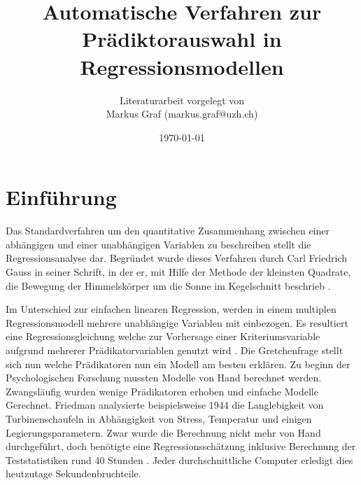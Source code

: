 \documentclass[english,12pt,doc]{apa}
\begin{document}
\title{Automatische Verfahren zur Prädiktorauswahl in Regressionsmodellen}
\author{Literaturarbeit vorgelegt von \\ Markus Graf (markus.graf@uzh.ch)}
\date{\today}
\maketitle
\setlength{\parindent}{0pt}
\newpage
\tableofcontents
\newpage
\section{Einführung}
Das Standardverfahren um den quantitative Zusammenhang zwischen einer abhängigen und einer unabhängigen Variablen zu beschreiben stellt die Regressionsanalyse dar. 
Begründet wurde dieses Verfahren durch Carl Friedrich Gauss in seiner Schrift, in der er, mit Hilfe der Methode der kleinsten Quadrate, die Bewegung der Himmelskörper um die Sonne im Kegelschnitt beschrieb \cite{gauss1809theoria}. 

Im Unterschied zur einfachen linearen Regression, werden in einem multiplen Regressionsmodell mehrere unabhängige Variablen mit einbezogen. 
Es resultiert eine Regressionsgleichung welche zur Vorhersage einer Kriteriumsvariable aufgrund mehrerer Prädikatorvariablen genutzt wird  \cite[S. 448]{bortz2011}. 
Die Gretchenfrage stellt sich nun welche Prädikatoren nun ein Modell am besten erklären. 
Zu beginn der Psychologischen Forschung mussten Modelle von Hand berechnet werden. Zwangsläufig wurden wenige Prädikatoren erhoben und einfache Modelle Gerechnet. 
Friedman analysierte beispielsweise 1944 die Langlebigkeit von Turbinenschaufeln in Abhängigkeit von Stress, Temperatur und einigen Legierungsparametern. 
Zwar wurde die Berechnung nicht mehr von Hand durchgeführt, doch benötigte eine Regressionsschätzung inklusive Berechnung der Teststatistiken rund 40 Stunden \cite[p.2]{armstrong2011illusions}. Jeder durchschnittliche Computer erledigt dies heutzutage Sekundenbruchteile. 
\end{document}
